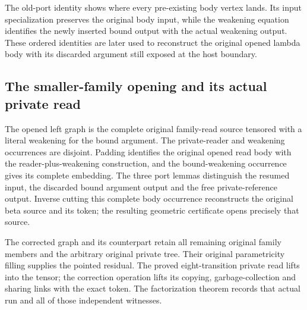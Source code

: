 The old-port identity shows where every pre-existing body vertex lands. Its input specialization preserves the original body input, while the weakening equation identifies the newly inserted bound output with the actual weakening output. These ordered identities are later used to reconstruct the original opened lambda body with its discarded argument still exposed at the host boundary.
\par{}
\par{}

\subsection{The smaller-family opening and its actual private read}
The opened left graph is the complete original family-read source tensored with a literal weakening for the bound argument. The private-reader and weakening occurrences are disjoint. Padding identifies the original opened read body with the reader-plus-weakening construction, and the bound-weakening occurrence gives its complete embedding. The three port lemmas distinguish the resumed input, the discarded bound argument output and the free private-reference output. Inverse cutting this complete body occurrence reconstructs the original beta source and its token; the resulting geometric certificate opens precisely that source.

The corrected graph and its counterpart retain all remaining original family members and the arbitrary original private tree. Their original parametricity filling supplies the pointed residual. The proved eight-transition private read lifts into the tensor; the correction operation lifts its copying, garbage-collection and sharing links with the exact token. The factorization theorem records that actual run and all of those independent witnesses.

